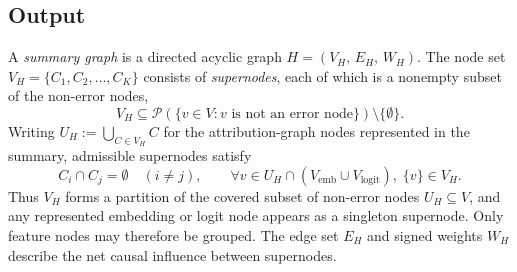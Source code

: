 \documentclass[../main.tex]{subfiles}
\begin{document}
\subsection{Output}
A \emph{summary graph} is a directed acyclic graph $H = (V_H,\, E_H,\, W_H)$.
The node set $V_H = \{C_1, C_2, \dots, C_K\}$ consists of \emph{supernodes}, each
of which is a nonempty subset of the non-error nodes,
\begin{equation}
V_H \subseteq \mathcal{P}\!\left(\{v \in V : v \text{ is not an error node}\}\right)
\setminus \{\emptyset\}.
\label{eq:summary-node-set}
\end{equation}
Writing $U_H := \bigcup_{C \in V_H} C$ for the attribution-graph nodes represented
in the summary, admissible supernodes satisfy
\begin{equation}
C_i \cap C_j = \emptyset \quad (i \ne j),
\qquad
\forall v \in U_H \cap (V_{\text{emb}} \cup V_{\text{logit}}),\; \{v\} \in V_H.
\label{eq:supernode-conditions}
\end{equation}
Thus $V_H$ forms a partition of the covered subset of non-error nodes
$U_H \subseteq V$, and any represented embedding or logit node appears
as a singleton supernode. Only feature nodes may therefore be grouped. The edge set
$E_H$ and signed weights $W_H$ describe the net causal influence between supernodes.
\end{document}

